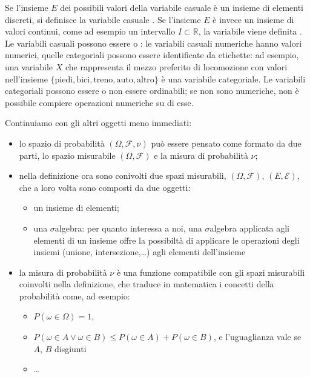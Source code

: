 \documentclass[letterpaper,10pt,italian]{jupyterBook}
\begin{document}
\sphinxAtStartPar
Se l’insieme \(E\) dei possibili valori della variabile casuale è un insieme di elementi discreti, si definisce la variabile casuale .
Se l’insieme \(E\) è invece un insieme di valori continui, come ad esempio un intervallo \(I \subset \mathbb{R}\), la variabile viene definita .
Le variabili casuali possono essere  o : le variabili casuali numeriche hanno valori numerici, quelle categoriali possono essere identificate da etichette: ad esempio, una variabile \(X\) che rappresenta il mezzo preferito di locomozione con valori nell’insieme \(\{ \text{piedi}, \text{bici}, \text{treno}, \text{auto}, \text{altro} \}\) è una variabile categoriale. Le variabili categoriali possono essere o non essere ordinabili; se non sono numeriche, non è possibile compiere operazioni numeriche su di esse.

\sphinxAtStartPar
Continuiamo con gli altri oggetti meno immediati:
\begin{itemize}
\item {} 
\sphinxAtStartPar
lo spazio di probabilità \((\Omega, \mathcal{F}, \nu)\) può essere pensato come formato da due parti, lo spazio misurabile \((\Omega, \mathcal{F})\) e la misura di probabilità \(\nu\);

\item {} 
\sphinxAtStartPar
nella definizione ora sono conivolti due spazi misurabili, \((\Omega, \mathcal{F})\), \((E, \mathcal{E})\), che a loro volta sono composti da due oggetti:
\begin{itemize}
\item {} 
\sphinxAtStartPar
un insieme di elementi;

\item {} 
\sphinxAtStartPar
una \(\sigma\)\sphinxhyphen{}algebra: per quanto interessa a noi, una \(\sigma\)\sphinxhyphen{}algebra applicata agli elementi di un insieme offre la possibiltà di applicare le operazioni degli insiemi (unione, intersezione,…) agli elementi dell’insieme

\end{itemize}

\item {} 
\sphinxAtStartPar
la misura di probabilità \(\nu\) è una funzione compatibile con gli spazi misurabili coinvolti nella definizione, che traduce in matematica i concetti della probabilità come, ad esempio:
\begin{itemize}
\item {} 
\sphinxAtStartPar
\(P(\omega \in \Omega) = 1\),

\item {} 
\sphinxAtStartPar
\(P(\omega \in A \lor \omega \in B) \le P(\omega \in A) + P(\omega \in B)\), e l’uguaglianza vale se \(A\), \(B\) disgiunti

\item {} 
\sphinxAtStartPar
…

\end{itemize}

\end{itemize}
\end{document}
